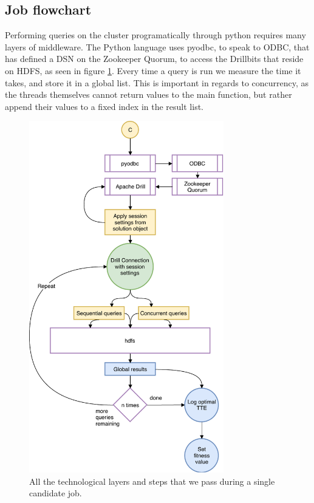 \documentclass[a4paper,english]{report}
\begin{document}
			\subsection{Job flowchart}
				\label{sec:jobs}
				Performing queries on the cluster programatically through python requires many layers of middleware. The Python language uses pyodbc, to speak to ODBC, that has defined a DSN on the Zookeeper Quorum, to access the Drillbits that reside on HDFS, as seen in figure \ref{fig:run_workflow}. Every time a query is run we measure the time it takes, and store it in a global list. This is important in regards to concurrency, as the threads themselves cannot return values to the main function, but rather append their values to a fixed index in the result list.
				\begin{figure}[H]
					\centering
					\includegraphics[width=240pt]{run_workflow}
					\caption{All the technological layers and steps that we pass during a single candidate job.}
					\label{fig:run_workflow}
				\end{figure}
			\clearpage
\end{document}
